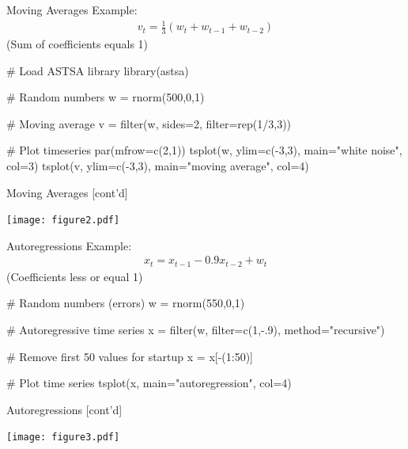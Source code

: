 \documentclass[ignorenonframetext,xcolor=x11names]{beamer}
\begin{document}
\begin{frame}[fragile]{Moving Averages}
Example:
\begin{align*}v_t = \frac{1}{3} ( w_{t} + w_{t-1} + w_{t-2})\end{align*}
(Sum of coefficients equals 1)
\begin{Rcode}
# Load ASTSA library
library(astsa)

# Random numbers
w = rnorm(500,0,1)

# Moving average
v = filter(w, sides=2, filter=rep(1/3,3))

# Plot timeseries
par(mfrow=c(2,1))
tsplot(w, ylim=c(-3,3), main="white noise", col=3)
tsplot(v, ylim=c(-3,3), main="moving average", col=4)
\end{Rcode}
\end{frame}

\begin{frame}{Moving Averages \small [cont'd]}
\centering

\texttt{[image: figure2.pdf]}
\end{frame}

\begin{frame}[fragile]{Autoregressions}
Example:
\begin{align*}x_t = x_{t-1} - 0.9 x_{t-2} + w_t\end{align*}
(Coefficients less or equal 1)
\begin{Rcode}
# Random numbers (errors)
w = rnorm(550,0,1)

# Autoregressive time series
x = filter(w, filter=c(1,-.9), method="recursive")

# Remove first 50 values for startup
x = x[-(1:50)]

# Plot time series
tsplot(x, main="autoregression", col=4)
\end{Rcode}
\end{frame}

\begin{frame}{Autoregressions \small [cont'd]}
\centering

\texttt{[image: figure3.pdf]}
\end{frame}
\end{document}
